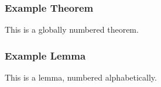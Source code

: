 \documentclass{beamer}
\begin{document}
\begin{frame}
    \frametitle{Example Theorem}
    \begin{theorem}
        This is a globally numbered theorem.
    \end{theorem}
\end{frame}

\begin{frame}
    \frametitle{Example Lemma}
    \begin{lemma}
        This is a lemma, numbered alphabetically.
    \end{lemma}
\end{frame}
\end{document}
